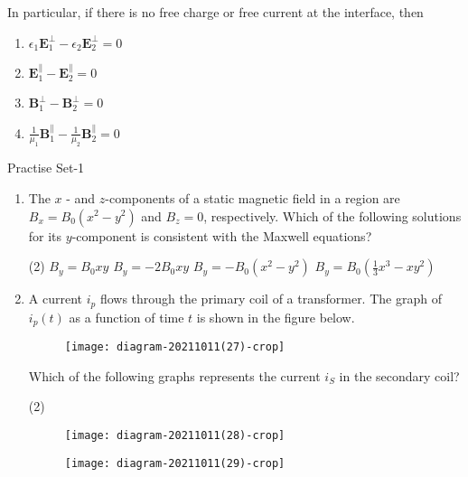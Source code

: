 In particular, if there is no free charge or free current at the interface, then 
\begin{enumerate}[label=(\roman*)]
	\item $\epsilon_{1} \mathbf{E}_{1}^{\perp}-\epsilon_{2} \mathbf{E}_{2}^{\perp}=0$
	\item $\mathbf{E}_{1}^{\|}-\mathbf{E}_{2}^{\|}=0$
	\item $\mathbf{B}_{1}^{\perp}-\mathbf{B}_{2}^{\perp}=0$
	\item $\frac{1}{\mu_{1}} \mathbf{B}_{1}^{\|}-\frac{1}{\mu_{2}} \mathbf{B}_{2}^{\|}=0$
\end{enumerate}

\newpage
\begin{abox}
	Practise Set-1
\end{abox}
\begin{enumerate}
	\item The $x$ - and $z$-components of a static magnetic field in a region are $B_{x}=B_{0}\left(x^{2}-y^{2}\right)$ and $B_{z}=0$, respectively. Which of the following solutions for its $y$-component is consistent with the Maxwell equations?
	{}
	\begin{tasks}(2)
		\task[\textbf{a.}]$B_{y}=B_{0} x y$
		\task[\textbf{b.}]$B_{y}=-2 B_{0} x y$
		\task[\textbf{c.}] $B_{y}=-B_{0}\left(x^{2}-y^{2}\right)$
		\task[\textbf{d.}]  $B_{y}=B_{0}\left(\frac{1}{3} x^{3}-x y^{2}\right)$
	\end{tasks}
	\item A current $i_{p}$ flows through the primary coil of a transformer. The graph of $i_{p}(t)$ as a function of time $t$ is shown in the figure below.\\
	\begin{figure}[H]
		\centering
		\texttt{[image: diagram-20211011(27)-crop]}
	\end{figure}
	Which of the following graphs represents the current $i_{S}$ in the secondary coil?
	{}
	\begin{tasks}(2)
		\task[\textbf{A.}] \begin{figure}[H]
			\centering
			\texttt{[image: diagram-20211011(28)-crop]}
		\end{figure}
		\task[\textbf{B.}] \begin{figure}[H]
			\centering
			\texttt{[image: diagram-20211011(29)-crop]}
		\end{figure}
		\task[\textbf{C.}] \begin{figure}[H]

\end{figure}
\end{tasks}
\end{enumerate}

